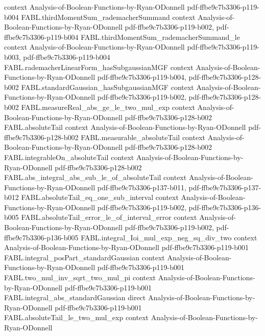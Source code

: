 \begin{theorem}
  {context}
  {Analysis-of-Boolean-Functions-by-Ryan-ODonnell}
  {pdf-ffbe9c7b3306-p119-b004}
\proofstep
  {FABL.thirdMomentSum_rademacherSummand}
  {context}
  {Analysis-of-Boolean-Functions-by-Ryan-ODonnell}
  {pdf-ffbe9c7b3306-p119-b002,
    pdf-ffbe9c7b3306-p119-b004}
\proofstep
  {FABL.thirdMomentSum_rademacherSummand_le}
  {context}
  {Analysis-of-Boolean-Functions-by-Ryan-ODonnell}
  {pdf-ffbe9c7b3306-p119-b003,
    pdf-ffbe9c7b3306-p119-b004}
\proofstep
  {FABL.rademacherLinearForm_hasSubgaussianMGF}
  {context}
  {Analysis-of-Boolean-Functions-by-Ryan-ODonnell}
  {pdf-ffbe9c7b3306-p119-b004,
    pdf-ffbe9c7b3306-p128-b002}
\proofstep
  {FABL.standardGaussian_hasSubgaussianMGF}
  {context}
  {Analysis-of-Boolean-Functions-by-Ryan-ODonnell}
  {pdf-ffbe9c7b3306-p119-b002,
    pdf-ffbe9c7b3306-p128-b002}
\proofstep
  {FABL.measureReal_abs_ge_le_two_mul_exp}
  {context}
  {Analysis-of-Boolean-Functions-by-Ryan-ODonnell}
  {pdf-ffbe9c7b3306-p128-b002}
\proofstep
  {FABL.absoluteTail}
  {context}
  {Analysis-of-Boolean-Functions-by-Ryan-ODonnell}
  {pdf-ffbe9c7b3306-p128-b002}
\proofstep
  {FABL.measurable_absoluteTail}
  {context}
  {Analysis-of-Boolean-Functions-by-Ryan-ODonnell}
  {pdf-ffbe9c7b3306-p128-b002}
\proofstep
  {FABL.integrableOn_absoluteTail}
  {context}
  {Analysis-of-Boolean-Functions-by-Ryan-ODonnell}
  {pdf-ffbe9c7b3306-p128-b002}
\proofstep
  {FABL.abs_integral_abs_sub_le_of_absoluteTail}
  {context}
  {Analysis-of-Boolean-Functions-by-Ryan-ODonnell}
  {pdf-ffbe9c7b3306-p137-b011,
    pdf-ffbe9c7b3306-p137-b012}
\proofstep
  {FABL.absoluteTail_eq_one_sub_interval}
  {context}
  {Analysis-of-Boolean-Functions-by-Ryan-ODonnell}
  {pdf-ffbe9c7b3306-p119-b002,
    pdf-ffbe9c7b3306-p136-b005}
\proofstep
  {FABL.absoluteTail_error_le_of_interval_error}
  {context}
  {Analysis-of-Boolean-Functions-by-Ryan-ODonnell}
  {pdf-ffbe9c7b3306-p119-b002,
    pdf-ffbe9c7b3306-p136-b005}
\proofstep
  {FABL.integral_Ioi_mul_exp_neg_sq_div_two}
  {context}
  {Analysis-of-Boolean-Functions-by-Ryan-ODonnell}
  {pdf-ffbe9c7b3306-p119-b001}
\proofstep
  {FABL.integral_posPart_standardGaussian}
  {context}
  {Analysis-of-Boolean-Functions-by-Ryan-ODonnell}
  {pdf-ffbe9c7b3306-p119-b001}
\proofstep
  {FABL.two_mul_inv_sqrt_two_mul_pi}
  {context}
  {Analysis-of-Boolean-Functions-by-Ryan-ODonnell}
  {pdf-ffbe9c7b3306-p119-b001}
\proofstep
  {FABL.integral_abs_standardGaussian}
  {direct}
  {Analysis-of-Boolean-Functions-by-Ryan-ODonnell}
  {pdf-ffbe9c7b3306-p119-b001}
\proofstep
  {FABL.absoluteTail_le_two_mul_exp}
  {context}
  {Analysis-of-Boolean-Functions-by-Ryan-ODonnell}

\end{theorem}
